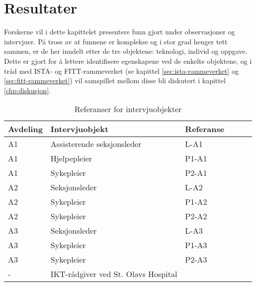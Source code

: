 \chapter{Resultater}
\label{chp:resultater} 
Forskerne vil i dette kapittelet presentere funn gjort under observasjoner og intervjuer. På tross av at funnene er komplekse og i stor grad henger tett sammen, er de her inndelt etter de tre objektene: teknologi, individ og oppgave. Dette er gjort for å lettere identifisere egenskapene ved de enkelte objektene, og i tråd med ISTA- og FITT-rammeverket (se kapittel \ref{sec:ista-rammeverket} og \ref{sec:fitt-rammeverket}) vil samspillet mellom disse bli diskutert i kapittel \ref{chp:diskusjon}.

\begin{table}[H]\centering
    \begin{tabular}{ |l|l|l|l|l|l| }
    \hline
    Avdeling & Intervjuobjekt & Referanse \\ \hline
       A1 & Assisterende seksjonsleder & L-A1 \\ \hline
       A1 & Hjelpepleier & P1-A1 \\ \hline
       A1 & Sykepleier & P2-A1 \\ \hline
       A2 & Seksjonsleder & L-A2 \\ \hline
       A2 & Sykepleier & P1-A2 \\ \hline
       A2 & Sykepleier & P2-A2 \\ \hline
       A3 & Seksjonsleder & L-A3 \\ \hline
       A3 & Sykepleier & P1-A3 \\ \hline
       A3 & Sykepleier & P2-A3 \\ \hline
       - & IKT-rådgiver ved St. Olavs Hospital &  \\ \hline
    \end{tabular}
    \caption {Referanser for intervjuobjekter}
    \label{referanserintervju}
\end{table}

